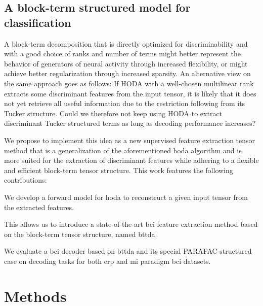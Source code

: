\subsection{A block-term structured model for classification}

A block-term decomposition that is directly optimized for discriminability and with a
good choice of ranks and number of terms might better represent the behavior
of generators of neural activity through increased flexibility, or might
achieve better regularization through increased sparsity.
An alternative view on the same approach goes as follows:
If HODA with a well-chosen multilinear rank extracts some discriminant features
from the input tensor, it is likely that it does not yet retrieve all useful
information due to the restriction following from its Tucker structure.
Could we therefore not keep using HODA to extract discriminant Tucker structured
terms as long as decoding performance increases?

We propose to implement this idea as a new supervised feature
extraction tensor method that is a generalization of the aforementioned
\ac{hoda}
algorithm and is more suited for the extraction of discriminant
features while adhering to a flexible and efficient block-term tensor
structure.
This work features the following contributions:
\begin{enumerate*}[label={\arabic*)}]
  \item  We develop a forward model for \ac{hoda} to reconstruct a
	      given input tensor from the extracted features.
      \item This allows us to introduce a state-of-the-art \ac{bci} feature extraction
        method based on the block-term tensor structure, named \acf{bttda}.
      \item We evaluate a \ac{bci} decoder based on \ac{bttda} and its special
        PARAFAC-structured case on decoding tasks for both \ac{erp} and \ac{mi}
        paradigm \ac{bci} datasets.
\end{enumerate*}


\section{Methods}

